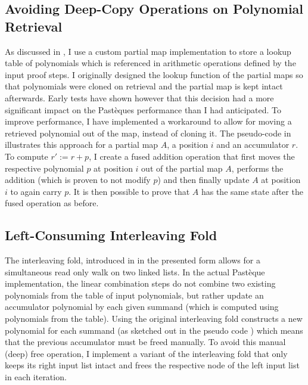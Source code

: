 \subsection{Avoiding Deep-Copy Operations on Polynomial Retrieval}\label{sec:avoiding-polynomial-deep-copies}
As discussed in , I use a custom partial map implementation to store a lookup table of polynomials which is referenced in arithmetic operations defined by the input proof steps.
I originally designed the lookup function of the partial maps so that polynomials were cloned on retrieval and the partial map is kept intact afterwards.
Early tests have shown however that this decision had a more significant impact on the Pastèques performance than I had anticipated.
To improve performance, I have implemented a workaround to allow for moving a retrieved polynomial out of the map, instead of cloning it.
The pseudo-code in  illustrates this approach for a partial map $A$, a position $i$ and an accumulator $r$.
To compute $r' := r + p$, I create a fused addition operation that first moves the respective polynomial $p$ at position $i$ out of the partial map $A$, performs the addition (which is proven to not modify $p$) and then finally update $A$ at position $i$ to again carry $p$.
It is then possible to prove that $A$ has the same state after the fused operation as before.

\subsection{Left-Consuming Interleaving Fold}\label{sec:left-consuming-interleaving-fold}
The interleaving fold, introduced in  in the presented form allows for a simultaneous read only walk on two linked lists.
In the actual Pastèque implementation, the linear combination steps do not combine two existing polynomials from the table of input polynomials, but rather update an accumulator polynomial by each given summand (which is computed using polynomials from the table).
Using the original interleaving fold constructs a new polynomial for each summand (as sketched out in the pseudo code ) which means that the previous accumulator must be freed manually.
To avoid this manual (deep) free operation, I implement a variant of the interleaving fold that only keeps its right input list intact and frees the respective node of the left input list in each iteration.

